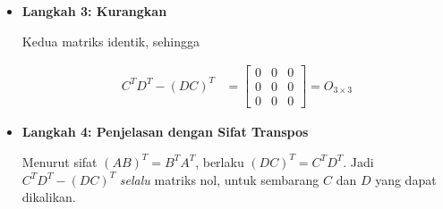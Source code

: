 \documentclass[10pt,a4paper]{article}
\newcounter{eqblock}
\newcommand{\reseteq}{%
  \stepcounter{eqblock}%
  \setcounter{equation}{0}%
  \renewcommand{\theHequation}{\arabic{eqblock}.\arabic{equation}}%
}
\begin{document}
\begin{enumerate}
\begin{enumerate}
\begin{itemize}
Setiap baris $D$ dikalikan dengan setiap kolom $C$, lalu hasilnya ditransposkan:
\reseteq
\begin{align}
DC &= \begin{bmatrix} 6 & 1 & 3 \\ -1 & 1 & 2 \\ 4 & 1 & 3 \end{bmatrix} \begin{bmatrix} 1 & 5 & 2 \\ -1 & 0 & 1 \\ 3 & 2 & 4 \end{bmatrix} \nonumber \\
&= \begin{bmatrix} 6 - 1 + 9 & 30 + 0 + 6 & 12 + 1 + 12 \\ -1 - 1 + 6 & -5 + 0 + 4 & -2 + 1 + 8 \\ 4 - 1 + 9 & 20 + 0 + 6 & 8 + 1 + 12 \end{bmatrix}
= \begin{bmatrix} 14 & 36 & 25 \\ 4 & -1 & 7 \\ 12 & 26 & 21 \end{bmatrix} \\
(DC)^T &= \begin{bmatrix} 14 & 4 & 12 \\ 36 & -1 & 26 \\ 25 & 7 & 21 \end{bmatrix}
\end{align}

\item \textbf{Langkah 3: Kurangkan}

Kedua matriks identik, sehingga
\reseteq
\begin{align}
C^T D^T - (DC)^T &= \begin{bmatrix} 0 & 0 & 0 \\ 0 & 0 & 0 \\ 0 & 0 & 0 \end{bmatrix} = O_{3 \times 3}
\end{align}

\item \textbf{Langkah 4: Penjelasan dengan Sifat Transpos}

Menurut sifat $(AB)^T = B^T A^T$, berlaku $(DC)^T = C^T D^T$. Jadi $C^T D^T - (DC)^T$ \emph{selalu} matriks nol, untuk sembarang $C$ dan $D$ yang dapat dikalikan.
\end{itemize}


\end{enumerate}
\end{enumerate}
\end{document}
